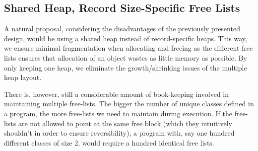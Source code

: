 \subsection{Shared Heap, Record Size-Specific Free Lists}
\label{subsec:shared-heap}
A natural proposal, considering the disadvantages of the previously presented design, would be using a shared heap instead of record-specific heaps. 
This way, we ensure minimal fragmentation when allocating and freeing as the different free lists ensures that allocation of an object wastes as little memory as possible. By only keeping one heap, we eliminate the growth/shrinking issues of the multiple heap layout. 

There is, however, still a considerable amount of book-keeping involved in maintaining multiple free-lists. The bigger the number of unique classes defined in a program, the more free-lists we need to maintain during execution. If the free-lists are not allowed to point at the same free block (which they intuitively shouldn't in order to ensure reversibility), a program with, say one hundred different classes of size 2, would require a hundred identical free lists. 

